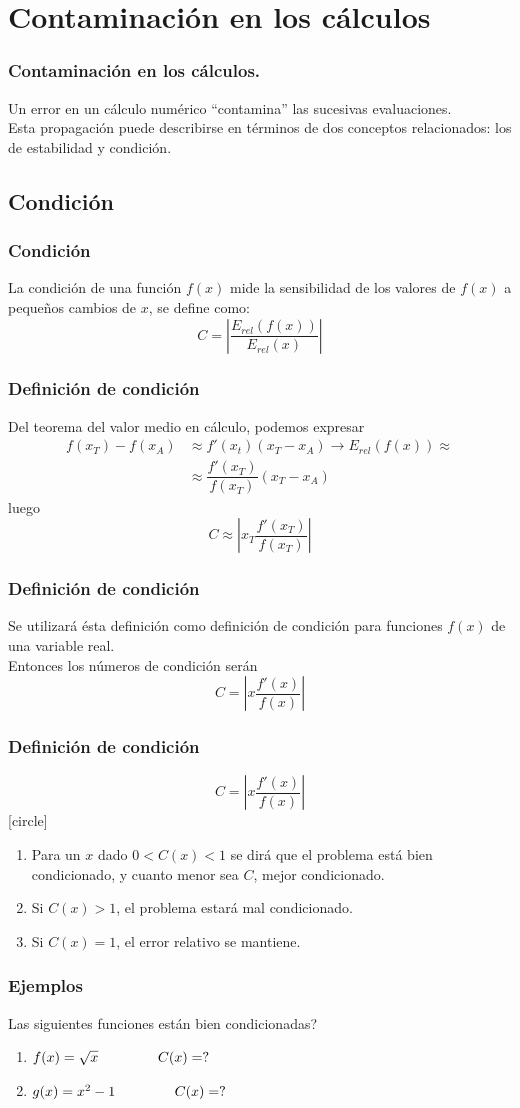 \section{Contaminación en los cálculos}
\begin{frame}
\frametitle{Contaminación en los cálculos.}
Un error en un cálculo numérico \enquote{contamina} las sucesivas evaluaciones.
\\
\bigskip
Esta propagación puede describirse en términos de dos conceptos relacionados: los de estabilidad y condición.
\end{frame}
\subsection{Condición}
\begin{frame}
\frametitle{Condición}
La condición de una función $f(x)$ mide la sensibilidad de los valores de $f(x)$ a pequeños
cambios de $x$, se define como:
\[ C = \left | \dfrac{E_{rel} (f(x))}{E_{rel}(x)} \right |  \]
\end{frame}
\begin{frame}
\frametitle{Definición de condición}
Del teorema del valor medio en cálculo, podemos expresar
\[ \begin{split} f(x_{T}) - f(x_{A}) & \approx f'(x_{t})(x_{T} - x_{A}) \rightarrow E_{rel}(f(x)) \approx \\ 
 & \approx \dfrac{f'(x_{T})}{f(x_{T})} (x_{T} - x_{A}) \end{split} \]
luego
\[ C \approx \left | x_{T} \dfrac{f'(x_{T})}{f(x_{T})} \right | \]
\end{frame}
\begin{frame}
\frametitle{Definición de condición}
Se utilizará ésta definición como definición de condición para funciones $f(x)$ de una variable real.
\\
\bigskip
Entonces los números de condición serán
\[ C = \left | x \dfrac{f'(x)}{f(x)} \right | \]
\end{frame}
\begin{frame}
\frametitle{Definición de condición}
\[ C = \left | x \dfrac{f'(x)}{f(x)} \right | \]
[circle]
\begin{enumerate}[<+->]
\item Para un $x$ dado $0 < C(x) < 1$ se dirá que el problema está bien condicionado, y cuanto menor sea $C$, mejor condicionado.
\item Si $C(x) > 1$, el problema estará mal condicionado.
\item Si $C(x) = 1$, el error relativo se mantiene.
\end{enumerate}
\end{frame}
\begin{frame}
\frametitle{Ejemplos}
 Las siguientes funciones están bien condicionadas?
\begin{enumerate}
\item $f(x) = \sqrt{x} \hspace{1.5cm} C(x) = ?$
\item $g(x) = x^{2}-1 \hspace{1.5cm} C(x) = ?$
\end{enumerate}
\end{frame}
